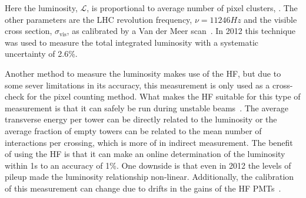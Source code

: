 Here the luminosity, $\mathcal{L}$, is proportional to average number of pixel clusters, .
The other parameters are the LHC revolution frequency, $\nu=11246\unit{Hz}$ and the visible cross section, $\sigma_\text{vis}$, as calibrated by a Van der Meer scan~\cite{Balagura:2011yw}.
In 2012 this technique was used to measure the total integrated luminosity with a systematic uncertainty of 2.6\%.

Another method to measure the luminosity makes use of the HF, but due to some sever limitations in its accuracy, this measurement is only used as a cross-check for the pixel counting method.
What makes the HF suitable for this type of measurement is that it can safely be run during unstable beams~\cite{CMS-PAS-LUM-13-001}.
The average transverse energy per tower can be directly related to the luminosity or the average fraction of empty towers can be related to the mean number of interactions per crossing, which is more of in indirect measurement.
The benefit of using the HF is that it can make an online determination of the luminosity within 1\unit{s} to an accuracy of 1\%.
One downside is that even in 2012 the levels of pileup made the luminosity relationship non-linear.
Additionally, the calibration of this measurement can change due to drifts in the gains of the HF PMTs~\cite{Pedro2014}.
